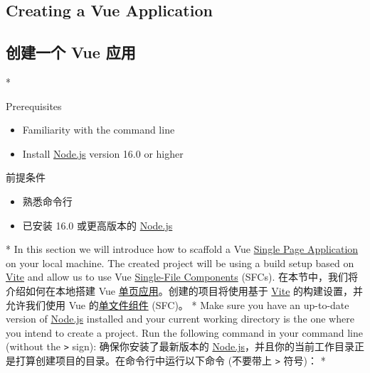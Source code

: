 \begin{paracol}{2}
\subsection{Creating a Vue Application}
\switchcolumn
\subsection{创建一个 Vue 应用}
\switchcolumn[0]*%
\begin{vueQuote}{Prerequisites}
\begin{itemize}
\item
    Familiarity with the command line
\item
    Install \href{https://nodejs.org/}{Node.js} version 16.0 or higher
\end{itemize}        
\end{vueQuote}    
\switchcolumn
\begin{vueQuote}{前提条件}
\begin{itemize}
\item
    熟悉命令行
\item
    已安装 16.0 或更高版本的 \href{https://nodejs.org/}{Node.js}
\end{itemize}
\end{vueQuote}    
\switchcolumn[0]*%
In this section we will introduce how to scaffold a Vue
\href{https://vuejs.org/guide/extras/ways-of-using-vue.html\#single-page-application-spa}{Single
Page Application} on your local machine. The created project will be
using a build setup based on \href{https://vitejs.dev/}{Vite} and allow
us to use Vue
\href{https://vuejs.org/guide/scaling-up/sfc.html}{Single-File
Components} (SFCs).
\switchcolumn
在本节中，我们将介绍如何在本地搭建 Vue
\href{https://cn.vuejs.org/guide/extras/ways-of-using-vue.html\#single-page-application-spa}{单页应用}。创建的项目将使用基于
\href{https://vitejs.dev/}{Vite} 的构建设置，并允许我们使用 Vue
的\href{https://cn.vuejs.org/guide/scaling-up/sfc.html}{单文件组件}
(SFC)。
\switchcolumn[0]*%
Make sure you have an up-to-date version of
\href{https://nodejs.org/}{Node.js} installed and your current working
directory is the one where you intend to create a project. Run the
following command in your command line (without the
\texttt{\textgreater{}} sign):
\switchcolumn
确保你安装了最新版本的
\href{https://nodejs.org/}{Node.js}，并且你的当前工作目录正是打算创建项目的目录。在命令行中运行以下命令
(不要带上 \texttt{\textgreater{}} 符号)：
\switchcolumn[0]*%

\switchcolumn


\end{paracol}
